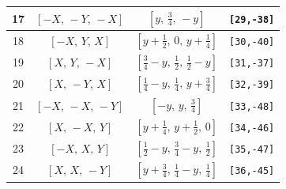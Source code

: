 \documentclass[fleqn,8pt]{jsarticle}
\begin{document}
\begin{longtable}{cccc}
17 & $\left[ - X,\, - Y,\, - X \right]$ & $\left[ y,\, \frac{3}{4},\, - y \right]$ & {\tt [29,-38]} \\ \hline
18 & $\left[ - X,\, Y,\, X \right]$ & $\left[ y + \frac{1}{2},\, 0,\, y + \frac{1}{4} \right]$ & {\tt [30,-40]} \\ \hline
19 & $\left[ X,\, Y,\, - X \right]$ & $\left[ \frac{3}{4} - y,\, \frac{1}{2},\, \frac{1}{2} - y \right]$ & {\tt [31,-37]} \\ \hline
20 & $\left[ X,\, - Y,\, X \right]$ & $\left[ \frac{1}{4} - y,\, \frac{1}{4},\, y + \frac{3}{4} \right]$ & {\tt [32,-39]} \\ \hline
21 & $\left[ - X,\, - X,\, - Y \right]$ & $\left[ - y,\, y,\, \frac{3}{4} \right]$ & {\tt [33,-48]} \\ \hline
22 & $\left[ X,\, - X,\, Y \right]$ & $\left[ y + \frac{1}{4},\, y + \frac{1}{2},\, 0 \right]$ & {\tt [34,-46]} \\ \hline
23 & $\left[ - X,\, X,\, Y \right]$ & $\left[ \frac{1}{2} - y,\, \frac{3}{4} - y,\, \frac{1}{2} \right]$ & {\tt [35,-47]} \\ \hline
24 & $\left[ X,\, X,\, - Y \right]$ & $\left[ y + \frac{3}{4},\, \frac{1}{4} - y,\, \frac{1}{4} \right]$ & {\tt [36,-45]} \\
\end{longtable}
\renewcommand{\arraystretch}{1.2}
\end{document}
